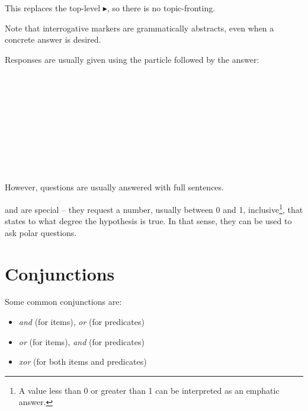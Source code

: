\documentclass{book}
\begin{document}
This replaces the top-level $\blacktriangleright$, so there is no topic-fronting.

Note that interrogative markers are grammatically abstracts, even when a concrete answer is desired.

Responses are usually given using the particle followed by the answer: \\
~\\
 \\
 \\
    \\
   \\
~\\
 \\
 \\
  \\
 \\

However,  questions are usually answered with full sentences.

 and  are special -- they request a number, usually between 0 and 1, inclusive\footnote{A value less than 0 or greater than 1 can be interpreted as an emphatic answer.}, that states to what degree the hypothesis is true. In that sense, they can be used to ask polar questions.

\section{Conjunctions}


Some common conjunctions are:

\begin{itemize}
  \item {} \emph{and} (for items), \emph{or} (for predicates)
  \item {} \emph{or} (for items), \emph{and} (for predicates)
  \item {} \emph{xor} (for both items and predicates)
\end{itemize}
\end{document}
